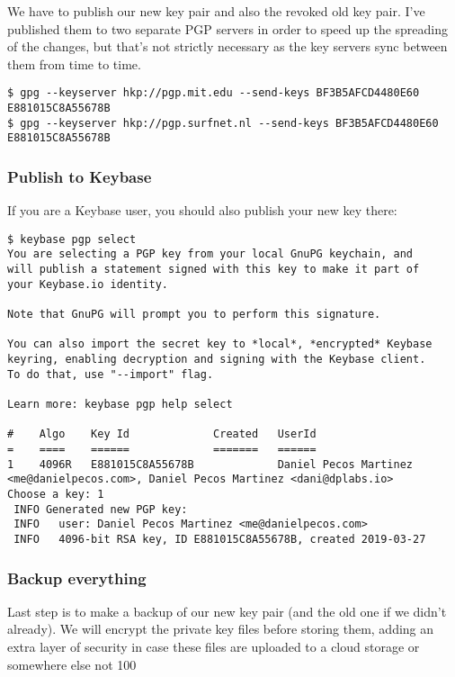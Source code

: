 We have to publish our new key pair and also the revoked old key pair. I’ve published them to two separate PGP servers in order to speed up the spreading of the changes, but that’s not strictly necessary as the key servers sync between them from time to time.
\begin{verbatim}
$ gpg --keyserver hkp://pgp.mit.edu --send-keys BF3B5AFCD4480E60 E881015C8A55678B
$ gpg --keyserver hkp://pgp.surfnet.nl --send-keys BF3B5AFCD4480E60 E881015C8A55678B
\end{verbatim}

\subsubsection{Publish to Keybase}

If you are a Keybase user, you should also publish your new key there:

\begin{verbatim}
$ keybase pgp select
You are selecting a PGP key from your local GnuPG keychain, and
will publish a statement signed with this key to make it part of
your Keybase.io identity.

Note that GnuPG will prompt you to perform this signature.

You can also import the secret key to *local*, *encrypted* Keybase
keyring, enabling decryption and signing with the Keybase client.
To do that, use "--import" flag.

Learn more: keybase pgp help select

#    Algo    Key Id             Created   UserId
=    ====    ======             =======   ======
1    4096R   E881015C8A55678B             Daniel Pecos Martinez <me@danielpecos.com>, Daniel Pecos Martinez <dani@dplabs.io>
Choose a key: 1
 INFO Generated new PGP key:
 INFO   user: Daniel Pecos Martinez <me@danielpecos.com>
 INFO   4096-bit RSA key, ID E881015C8A55678B, created 2019-03-27
\end{verbatim}

\subsubsection{Backup everything}

Last step is to make a backup of our new key pair (and the old one if we didn’t already). We will encrypt the private key files before storing them, adding an extra layer of security in case these files are uploaded to a cloud storage or somewhere else not 100%

